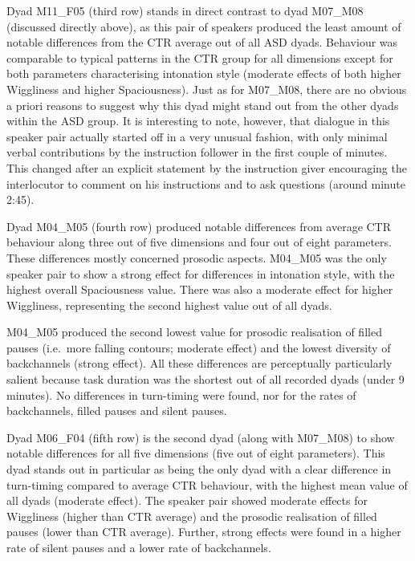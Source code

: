 Dyad M11\_F05 (third row) stands in direct contrast to dyad M07\_M08 (discussed directly above), as this pair of speakers produced the least amount of notable differences from the CTR average out of all ASD dyads. Behaviour was comparable to typical patterns in the CTR group for all dimensions except for both parameters characterising intonation style (moderate effects of both higher Wiggliness and higher Spaciousness). Just as for M07\_M08, there are no obvious a priori reasons to suggest why this dyad might stand out from the other dyads within the ASD group. It is interesting to note, however, that dialogue in this speaker pair actually started off in a very unusual fashion, with only minimal verbal contributions by the instruction follower in the first couple of minutes. This changed after an explicit statement by the instruction giver encouraging the interlocutor to comment on his instructions and to ask questions (around minute 2:45).

Dyad M04\_M05 (fourth row) produced notable differences from average CTR behaviour along three out of five dimensions and four out of eight parameters. These differences mostly concerned prosodic aspects. M04\_M05 was the only speaker pair to show a strong effect for differences in intonation style, with the highest overall Spaciousness value. There was also a moderate effect for higher Wiggliness, representing the second highest value out of all dyads.

M04\_M05 produced the second lowest value for prosodic realisation of filled pauses (i.e.~more falling contours; moderate effect) and the lowest diversity of backchannels (strong effect). All these differences are perceptually particularly salient because task duration was the shortest out of all recorded dyads (under 9 minutes). No differences in turn-timing were found, nor for the rates of backchannels, filled pauses and silent pauses.

Dyad M06\_F04 (fifth row) is the second dyad (along with M07\_M08) to show notable differences for all five dimensions (five out of eight parameters). This dyad stands out in particular as being the only dyad with a clear difference in turn-timing compared to average CTR behaviour, with the highest mean value of all dyads (moderate effect). The speaker pair showed moderate effects for Wiggliness (higher than CTR average) and the prosodic realisation of filled pauses (lower than CTR average). Further, strong effects were found in a higher rate of silent pauses and a lower rate of backchannels.

